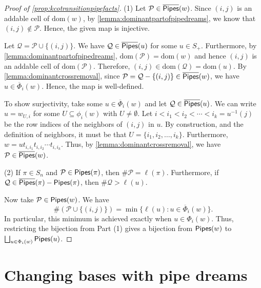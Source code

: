 \documentclass[12 pt]{amsart}
\newcommand{\dom}{\mathrm{dom}}
\numberwithin{equation}{section}
\theoremstyle{remark}
\newcommand{\pipes}{{\sf Pipes}}
\newcommand{\kpipes}{\overline{\sf Pipes}}
\newcommand{\cotransitionperms}{\Phi}
\newcommand{\cotransitionindices}{\phi}
\newcommand{\kcotransitionperms}{\overline{\Phi}}
\begin{document}
		\begin{proof}[Proof of {\cref{prop:kcotransitionpipefacts}}]
			\noindent (1) Let $\mathcal{P} \in \kpipes(w)$. 
			Since $(i,j)$ is an addable cell of $\dom(w)$, by \cref{lemma:dominantpartofpipedreams}, we know that $(i,j)\notin \mathcal{P}$. 
			Hence, the given map is injective. 
			
			Let $\mathcal{Q} = \mathcal{P} \cup \{(i,j)\}$. 
			We have $\mathcal{Q} \in \kpipes(u)$ for some $u \in S_+$. 
			Furthermore, by \cref{lemma:dominantpartofpipedreams}, $\dom(\mathcal{P})=\dom(w)$ and hence $(i,j)$ is an addable cell of $\dom(\mathcal{P})$. Therefore, $(i,j) \in \dom(\mathcal{Q}) = \dom(u)$. 
			By \cref{lemma:dominantcrossremoval}, since $\mathcal{P} = \mathcal{Q}-\{(i,j)\} \in \kpipes(w)$, we have $u \in \kcotransitionperms_i(w)$.
			Hence, the map is well-defined.

		
			To show surjectivity, take some $u \in \kcotransitionperms_{i}(w)$ and let $\mathcal{Q} \in \kpipes(u)$. We can write $u=w_{U,i}$ for some $U\subseteq \cotransitionindices_i(w)$ with $U\neq \emptyset$.
			Let $i < i_1 < i_2 < \cdots < i_k = u^{-1}(j)$ be the row indices of the neighbors of $(i,j)$ in $u$. 
			By construction, and the definition of neighbors, it must be that $U=\{i_1,i_2,\ldots,i_k\}$.
			Furthermore, $w=ut_{i,i_1}t_{i,i_2}\cdots t_{i,i_k}$. Thus, by \cref{lemma:dominantcrossremoval}, we have $\mathcal{P} \in \kpipes(w)$.
						
			\noindent (2) If $\pi \in S_n$ and $\mathcal{P} \in \pipes(\pi)$, then $\#\mathcal{P} = \ell(\pi)$. 
			Furthermore, if $\mathcal{Q} \in \kpipes(\pi)-\pipes(\pi)$, then $\#\mathcal{Q} > \ell(u)$. 
			
			Now take $\mathcal{P}\in \pipes(w)$.
			We have 
			\[\#(\mathcal{P} \cup \{(i,j)\}) = \min\{\ell(u):u \in \kcotransitionperms_i(w)\}.\] 
			In particular, this minimum is achieved exactly when $u \in \cotransitionperms_i(w)$. 
			Thus, restricting the bijection from Part (1) gives a bijection from $\pipes(w)$ to $\bigsqcup_{u \in \cotransitionperms_i(w)} \pipes(u)$.
		\end{proof}
		
	
		
		\section{Changing bases with pipe dreams}
		
		\label{section:pipechangebasis}
		
\end{document}
